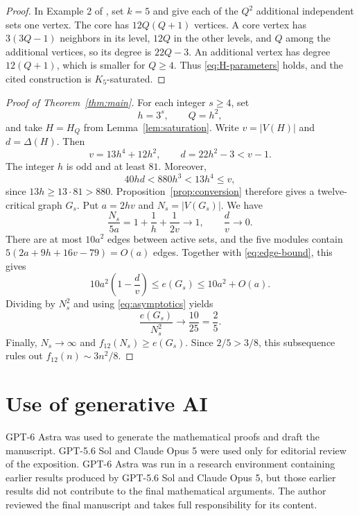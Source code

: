 \documentclass[11pt]{article}
\numberwithin{equation}{section}
\begin{document}
\begin{proof}
In Example 2 of \cite{AEHK}, set \(k=5\) and give each of the
\(Q^2\) additional independent sets one vertex. The core has
\(12Q(Q+1)\) vertices. A core vertex has \(3(3Q-1)\) neighbors
in its level, \(12Q\) in the other levels, and \(Q\) among the
additional vertices, so its degree is \(22Q-3\). An additional
vertex has degree \(12(Q+1)\), which is smaller for \(Q\ge4\).
Thus \eqref{eq:H-parameters} holds, and the cited construction is
\(K_5\)-saturated.
\end{proof}

\begin{proof}[Proof of Theorem~\ref{thm:main}]
For each integer \(s\ge4\), set
\[
 h=3^s,\qquad Q=h^2,
\]
and take \(H=H_Q\) from Lemma~\ref{lem:saturation}. Write
\(v=|V(H)|\) and \(d=\Delta(H)\). Then
\[
 v=13h^4+12h^2,\qquad d=22h^2-3<v-1.
\]
The integer \(h\) is odd and at least \(81\). Moreover,
\[
 40hd<880h^3<13h^4\le v,
\]
since \(13h\ge13\cdot81>880\).
Proposition~\ref{prop:conversion} therefore gives a twelve-critical
graph \(G_s\). Put \(a=2hv\) and \(N_s=|V(G_s)|\). We have
\begin{equation}\label{eq:asymptotics}
 \frac{N_s}{5a}=1+\frac1h+\frac1{2v}\longrightarrow1,
 \qquad \frac d v\longrightarrow0.
\end{equation}
There are at most \(10a^2\) edges between active sets, and the
five modules contain \(5(2a+9h+16v-79)=O(a)\) edges.
Together with \eqref{eq:edge-bound}, this gives
\[
 10a^2\left(1-\frac d v\right)
 \le e(G_s)\le10a^2+O(a).
\]
Dividing by \(N_s^2\) and using \eqref{eq:asymptotics} yields
\[
 \frac{e(G_s)}{N_s^2}\longrightarrow\frac{10}{25}=\frac25.
\]
Finally, \(N_s\to\infty\) and \(f_{12}(N_s)\ge e(G_s)\).
Since \(2/5>3/8\), this subsequence rules out
\(f_{12}(n)\sim3n^2/8\).
\end{proof}

\section*{Use of generative AI}

GPT-6 Astra was used to generate the mathematical proofs and draft the
manuscript. GPT-5.6 Sol and Claude Opus 5 were used only for editorial
review of the exposition. GPT-6 Astra was run in a research environment
containing earlier results produced by GPT-5.6 Sol and Claude Opus 5, but
those earlier results did not contribute to the final mathematical
arguments. The author reviewed the final manuscript and takes full
responsibility for its content.
\end{document}
